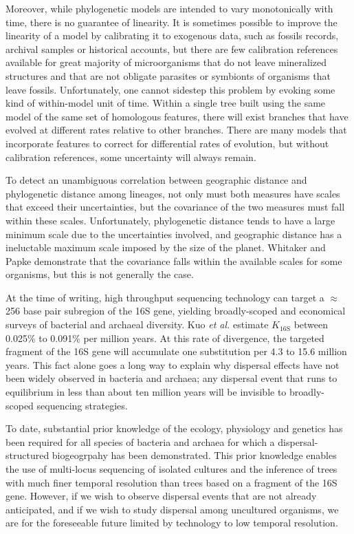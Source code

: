Moreover, while phylogenetic models are intended to vary monotonically with time, there is no guarantee of linearity. It is sometimes possible to improve the linearity of a model by calibrating it to exogenous data, such as fossils records, archival samples or historical accounts, but there are few calibration references available for great majority of microorganisms that do not leave mineralized structures and that are not obligate parasites or symbionts of organisms that leave fossils. Unfortunately, one cannot sidestep this problem by evoking some kind of within-model unit of time. Within a single tree built using the same model of the same set of homologous features, there will exist branches that have evolved at different rates relative to other branches. There are many models that incorporate features to correct for differential rates of evolution, but without calibration references, some uncertainty will always remain.

To detect an unambiguous correlation between geographic distance and phylogenetic distance among lineages, not only must both measures have scales that exceed their uncertainties, but the covariance of the two measures must fall within these scales. Unfortunately, phylogenetic distance tends to have a large minimum scale due to the uncertainties involved, and geographic distance has a ineluctable maximum scale imposed by the size of the planet. Whitaker and Papke demonstrate that the covariance falls within the available scales for some organisms, but this is not generally the case.

At the time of writing, high throughput sequencing technology can target a $\approx$ 256 base pair subregion of the 16S gene, yielding broadly-scoped and economical surveys of bacterial and archaeal diversity. Kuo {\em et al.} estimate $K_{\mathrm{16S}}$ between 0.025\% to 0.091\% per million years. \cite{kuo2009inferring} At this rate of divergence, the targeted fragment of the 16S gene will accumulate one substitution per 4.3 to 15.6 million years. This fact alone goes a long way to explain why dispersal effects have not been widely observed in bacteria and archaea; any dispersal event that runs to equilibrium in less than about ten million years will be invisible to broadly-scoped sequencing strategies.

To date, substantial prior knowledge of the ecology, physiology and genetics has been required for all species of bacteria and archaea for which a dispersal-structured biogeogrpahy has been demonstrated. This prior knowledge enables the use of multi-locus sequencing of isolated cultures and the inference of trees with much finer temporal resolution than trees based on a fragment of the 16S gene. However, if we wish to observe dispersal events that are not already anticipated, and if we wish to study dispersal among uncultured organisms, we are for the foreseeable future limited by technology to low temporal resolution.

